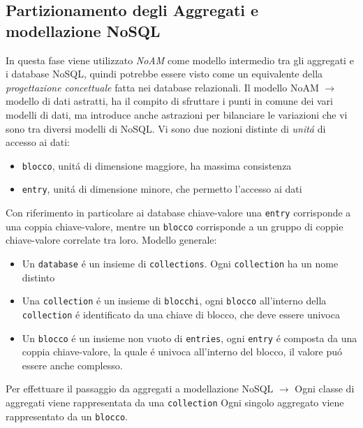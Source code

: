 \subsection{Partizionamento degli Aggregati e modellazione NoSQL}
In questa fase viene utilizzato \emph{NoAM} come modello intermedio tra gli aggregati e i database NoSQL, quindi potrebbe
essere visto come un equivalente della \emph{progettazione concettuale} fatta nei database relazionali.
Il modello NoAM $\to$ modello di dati astratti, ha il compito di sfruttare i punti in comune dei vari modelli di dati, ma
introduce anche astrazioni per bilanciare le variazioni che vi sono tra diversi modelli di NoSQL.
Vi sono due nozioni distinte di \emph{unitá} di accesso ai dati:
\begin{itemize}
    \item \texttt{blocco}, unitá di dimensione maggiore, ha massima consistenza
    \item \texttt{entry}, unitá di dimensione minore, che permetto l'accesso ai dati
\end{itemize}
Con riferimento in particolare ai database chiave-valore una \texttt{entry} corrisponde a una coppia chiave-valore, mentre
un \texttt{blocco} corrisponde a un gruppo di coppie chiave-valore correlate tra loro.
Modello generale:
\begin{itemize}[itemsep=2pt,parsep=2pt]
    \item Un \texttt{database} é un insieme di \texttt{collections}. Ogni \texttt{collection} ha un nome distinto\
    \item Una \texttt{collection} é un insieme di \texttt{blocchi}, ogni \texttt{blocco}
    all'interno della \texttt{collection} é identificato da una chiave di blocco, che deve essere univoca
    \item Un \texttt{blocco} é un insieme non vuoto di \texttt{entries}, ogni \texttt{entry} é composta da una coppia
    chiave-valore, la quale é univoca all'interno del blocco, il valore puó essere anche complesso.
\end{itemize}
Per effettuare il passaggio da aggregati a modellazione NoSQL $\to$
Ogni classe di aggregati viene rappresentata da una \texttt{collection}
Ogni singolo aggregato viene rappresentato da un \texttt{blocco}.

